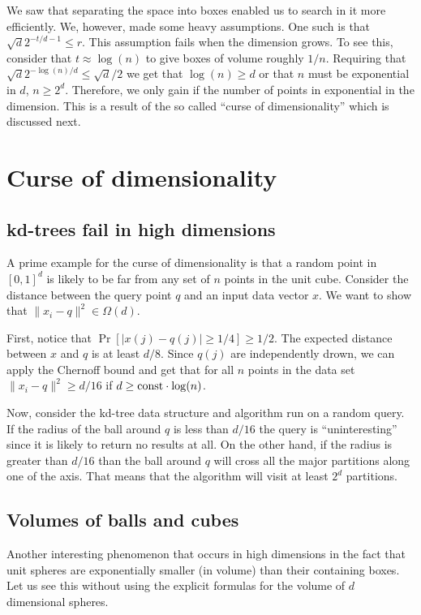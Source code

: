 \documentclass{article}
\begin{document}
We saw that separating the space into boxes enabled us to search in it more efficiently.
We, however, made some heavy assumptions. One such is that $\sqrt{d}2^{-t/d-1} \le r$.
This assumption fails when the dimension grows. To see this, consider that $t \approx \log(n)$ 
to give boxes of volume roughly $1/n$. Requiring that $\sqrt{d}2^{-\log(n)/d} \le \sqrt{d}/2$ we get that $\log(n) \ge d$ or that $n$ must be
exponential in $d$, $n \ge 2^{d}$. Therefore, we only gain if the number of points in exponential in the dimension.
This is a result of the so called ``curse of dimensionality'' which is discussed next.

\section{Curse of dimensionality}
\subsection{kd-trees fail in high dimensions}
A prime example for the curse of dimensionality is that a random point in $[0,1]^d$ is likely to be far from any set of $n$ points in the unit cube.
Consider the distance between the query point $q$ and an input data vector $x$.
We want to show that $\|x_i-q\|^2 \in \Omega(d)$.

First, notice that $\Pr[|x(j)- q(j)| \ge 1/4] \ge 1/2$. The expected distance between $x$ and $q$ is at least $d/8$.
Since $q(j)$ are independently drown, we can apply the Chernoff bound and get that for all $n$ points in the data set
$\|x_i-q\|^2 \ge d/16$ if $d \ge {\operatorname{const}}\cdot\log(n)$.

Now, consider the kd-tree data structure and algorithm run on a random query.
If the radius of the ball around $q$ is less than $d/16$ the query is ``uninteresting'' since it is likely to return no results at all.
On the other hand, if the radius is greater than $d/16$ than the ball around $q$ will cross all the major partitions 
along one of the axis. That means that the algorithm will visit at least $2^d$ partitions.


\subsection{Volumes of balls and cubes}
Another interesting phenomenon that occurs in high dimensions in the fact that unit spheres 
are exponentially smaller (in volume) than their containing boxes.
Let us see this without using the explicit formulas for the volume of $d$ dimensional spheres.
\end{document}
